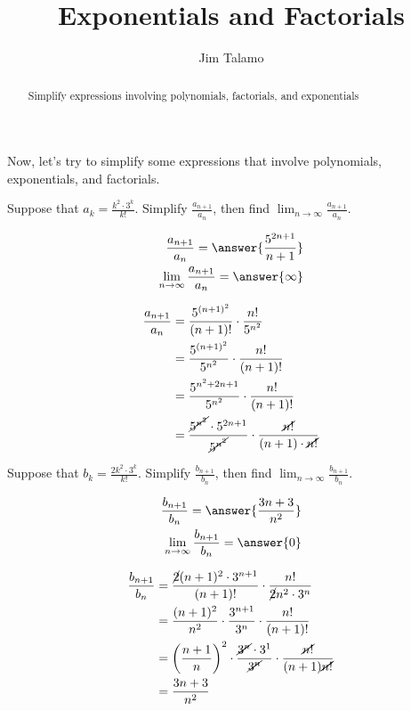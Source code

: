 \documentclass{ximera}
\title[Refresh:]{Exponentials and Factorials}
\author{Jim Talamo}
\begin{document}
\begin{abstract}
  Simplify expressions involving polynomials, factorials, and exponentials
\end{abstract}
\maketitle


\begin{exercise}

Now, let's try to simplify some expressions that involve polynomials, exponentials, and factorials.

Suppose that $a_k = \frac{k^2 \cdot 3^k}{k!}$. Simplify $\frac{a_{n+1}}{a_n}$, then find $\lim_{n \to \infty} \frac{a_{n+1}}{a_n}$.

\begin{align*}
\frac{a_{n+1}}{a_n} = \answer{ \frac{5^{2n+1}}{n+1}} \\
\lim_{n \to \infty} \frac{a_{n+1}}{a_n} = \answer{\infty}
\end{align*}

\begin{hint}
\begin{align*}
\frac{a_{n+1}}{a_n} &= \frac{5^{(n+1)^2}}{(n+1)!} \cdot \frac{n!}{5^{n^2}} \\
&=  \frac{5^{(n+1)^2}}{5^{n^2}}  \cdot \frac{n!}{(n+1)!} \\
&=  \frac{5^{n^2+2n+1}}{5^{n^2}}  \cdot \frac{n!}{(n+1)!} \\
&=  \frac{\cancel{5^{n^2}} \cdot 5^{2n+1}}{\cancel{5^{n^2}}}  \cdot \frac{\cancel{n!}}{(n+1) \cdot \cancel{n!}} \\
\end{align*}
\end{hint}

Suppose that $b_k = \frac{2k^2 \cdot 3^k}{k!}$. Simplify $\frac{b_{n+1}}{b_n}$, then find $\lim_{n \to \infty} \frac{b_{n+1}}{b_n}$.

\begin{align*}
\frac{b_{n+1}}{b_n} = \answer{  \frac{3n+3}{n^2} } \\
\lim_{n \to \infty} \frac{b_{n+1}}{b_n} = \answer{0}
\end{align*}

\begin{hint}
\begin{align*}
 \frac{b_{n+1}}{b_n} &=  \frac{\cancel{2}(n+1)^2 \cdot 3^{n+1}}{(n+1)!} \cdot \frac{n!} {\cancel{2}n^2 \cdot 3^n} \\
&=  \frac{(n+1)^2}{n^2} \cdot \frac{3^{n+1}}{3^n} \cdot \frac{n!}{(n+1)!} \\
&=  \left(\frac{n+1}{n}\right)^2 \cdot \frac{\cancel{3^n} \cdot 3^1}{\cancel{3^n}} \cdot \frac{\cancel{n!}}{(n+1)\cancel{n!}} \\
&=  \frac{3n+3}{n^2} \\
\end{align*}

\end{hint}


\end{exercise}
\end{document}
